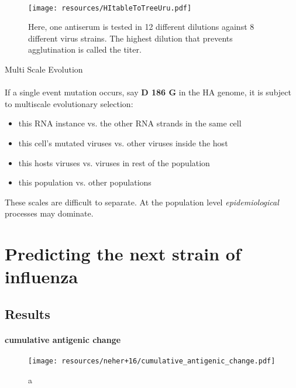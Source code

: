 \documentclass{beamer}
\begin{document}
\begin{darkframes}
    \begin{frame}{\subsecname}
      \framesubtitle{}
      \begin{figure}
        \texttt{[image: resources/HItableToTreeUru.pdf]}
        \caption{\footnotesize Here, one antiserum is tested in 12 different dilutions against 8 different virus strains. The highest dilution that prevents agglutination is called the titer.}
      \end{figure}
    \end{frame}


    \begin{frame}{Multi Scale Evolution}
      \framesubtitle{}
      If a single event mutation occurs, say \textbf{D 186 G} in the HA genome, it is subject to multiscale evolutionary selection:
      \begin{itemize}
        \item this RNA instance vs. the other RNA strands in the same cell
        \item this cell's mutated viruses vs. other viruses inside the host
        \item this hosts viruses vs. viruses in rest of the population
        \item this population vs. other populations
      \end{itemize}
      These scales are difficult to separate. At the population level \textit{epidemiological} processes may dominate.
    \end{frame}










  \section{Predicting the next strain of influenza}

  \subsection{Results}

    \begin{frame}{\subsecname}
      \framesubtitle{cumulative antigenic change}
      \begin{figure}
        \texttt{[image: resources/neher+16/cumulative\_antigenic\_change.pdf]}
        \caption{\footnotesize a}
      \end{figure}
    \end{frame}


\end{darkframes}
\end{document}
